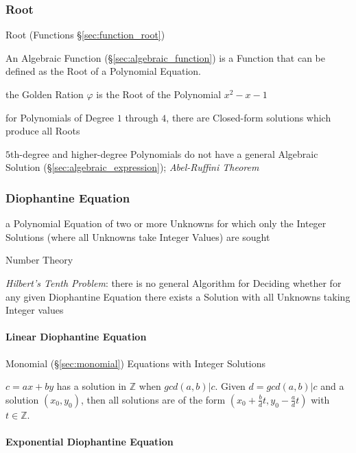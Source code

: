 \subsubsection{Root}\label{sec:equation_root}

\fist Root (Functions \S\ref{sec:function_root})

An Algebraic Function (\S\ref{sec:algebraic_function}) is a Function that can
be defined as the Root of a Polynomial Equation.

the Golden Ration $\varphi$ is the Root of the Polynomial $x^2 - x - 1$

for Polynomials of Degree $1$ through $4$, there are Closed-form solutions
which produce all Roots

$5$th-degree and higher-degree Polynomials do not have a general Algebraic
Solution (\S\ref{sec:algebraic_expression}); \emph{Abel-Ruffini Theorem}



\subsubsection{Diophantine Equation}\label{sec:diophantine_equation}

a Polynomial Equation of two or more Unknowns for which only the Integer
Solutions (where all Unknowns take Integer Values) are sought

\fist Number Theory

\emph{Hilbert's Tenth Problem}: there is no general Algorithm for Deciding
whether for any given Diophantine Equation there exists a Solution with all
Unknowns taking Integer values



\paragraph{Linear Diophantine Equation}
\label{sec:linear_diophantine}\hfill

Monomial (\S\ref{sec:monomial}) Equations with Integer Solutions

$c = ax + by$ has a solution in $\mathbb{Z}$ when $gcd(a,b)|c$. Given
$d=gcd(a,b)|c$ and a solution $(x_0, y_0)$, then all solutions are of
the form $(x_0 + \frac{b}{d}t, y_0 - \frac{a}{d}t)$ with $t \in
\mathbb{Z}$.



\paragraph{Exponential Diophantine Equation}\hfill
\label{sec:exponential_diophantine}



